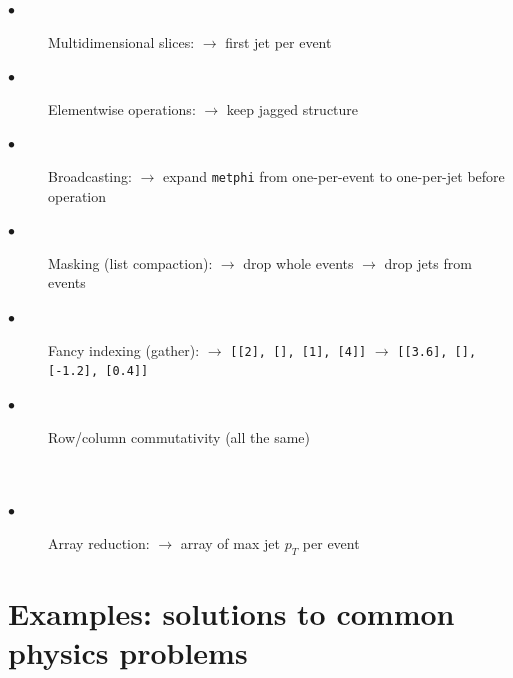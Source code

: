 \documentclass{webofc}
\begin{document}
\begin{description}
\item[\hspace{1 cm}$\bullet$] Multidimensional slices:  $\to$ first jet per event
\item[\hspace{1 cm}$\bullet$] Elementwise operations:  $\to$ keep jagged structure
\item[\hspace{1 cm}$\bullet$] Broadcasting:  $\to$ expand {\small \texttt{metphi}} from
\tabto{5.8 cm}one-per-event to one-per-jet before operation
\item[\hspace{1 cm}$\bullet$] Masking (list compaction):  $\to$ drop whole events
 $\to$ drop jets from events  
\item[\hspace{1 cm}$\bullet$] Fancy indexing (gather):  $\to$ {\small \texttt{[[2], [], [1], [4]]}}
 $\to$ \mbox{\small \texttt{[[3.6], [], [-1.2], [0.4]]}\hspace{-0.5 cm}}
\item[\hspace{1 cm}$\bullet$] Row/column commutativity  (all the same)
 \\
 \\
 \\
\item[\hspace{1 cm}$\bullet$] Array reduction:  $\to$ array of max jet $p_T$ per event
\end{description}

\section{Examples: solutions to common physics problems}
\end{document}
